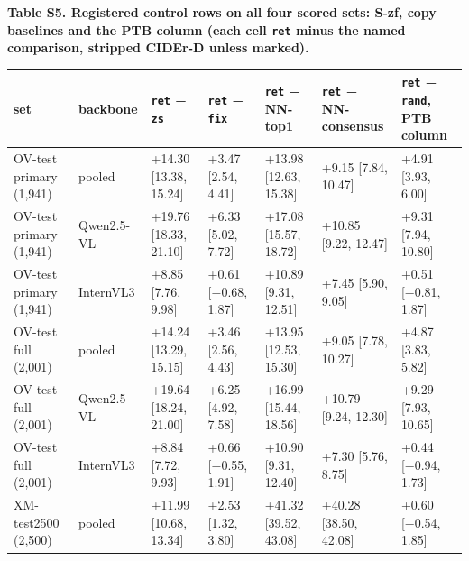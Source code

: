 \documentclass[manuscript,screen]{acmart}
\begin{document}
\textbf{Table S5. Registered control rows on all four scored sets: S-zf, copy baselines and the PTB
column (each cell \texttt{ret} minus the named comparison, stripped CIDEr-D unless marked).}

\begin{longtable}[]{@{}
  >{\raggedright\arraybackslash}p{}
  >{\raggedright\arraybackslash}p{}
  >{\raggedright\arraybackslash}p{}
  >{\raggedright\arraybackslash}p{}
  >{\raggedright\arraybackslash}p{}
  >{\raggedright\arraybackslash}p{}
  >{\raggedright\arraybackslash}p{}@{}}
\toprule\noalign{}
set & backbone & \texttt{ret} − \texttt{zs} & \texttt{ret} − \texttt{fix} & \texttt{ret} − NN-top1 & \texttt{ret} − NN-consensus & \texttt{ret} − \texttt{rand}, PTB column \\
\midrule\noalign{}
\endhead
\bottomrule\noalign{}
\endlastfoot
OV-test primary (1,941) & pooled & +14.30 {[}13.38, 15.24{]} & +3.47 {[}2.54, 4.41{]} & +13.98
{[}12.63, 15.38{]} & +9.15 {[}7.84, 10.47{]} & +4.91 {[}3.93, 6.00{]} \\
OV-test primary (1,941) & Qwen2.5-VL & +19.76 {[}18.33, 21.10{]} & +6.33 {[}5.02, 7.72{]} & +17.08
{[}15.57, 18.72{]} & +10.85 {[}9.22, 12.47{]} & +9.31 {[}7.94, 10.80{]} \\
OV-test primary (1,941) & InternVL3 & +8.85 {[}7.76, 9.98{]} & +0.61 {[}−0.68, 1.87{]} & +10.89
{[}9.31, 12.51{]} & +7.45 {[}5.90, 9.05{]} & +0.51 {[}−0.81, 1.87{]} \\
OV-test full (2,001) & pooled & +14.24 {[}13.29, 15.15{]} & +3.46 {[}2.56, 4.43{]} & +13.95
{[}12.53, 15.30{]} & +9.05 {[}7.78, 10.27{]} & +4.87 {[}3.83, 5.82{]} \\
OV-test full (2,001) & Qwen2.5-VL & +19.64 {[}18.24, 21.00{]} & +6.25 {[}4.92, 7.58{]} & +16.99
{[}15.44, 18.56{]} & +10.79 {[}9.24, 12.30{]} & +9.29 {[}7.93, 10.65{]} \\
OV-test full (2,001) & InternVL3 & +8.84 {[}7.72, 9.93{]} & +0.66 {[}−0.55, 1.91{]} & +10.90
{[}9.31, 12.40{]} & +7.30 {[}5.76, 8.75{]} & +0.44 {[}−0.94, 1.73{]} \\
XM-test2500 (2,500) & pooled & +11.99 {[}10.68, 13.34{]} & +2.53 {[}1.32, 3.80{]} & +41.32 {[}39.52,
43.08{]} & +40.28 {[}38.50, 42.08{]} & +0.60 {[}−0.54, 1.85{]} \\

\end{longtable}
\end{document}
